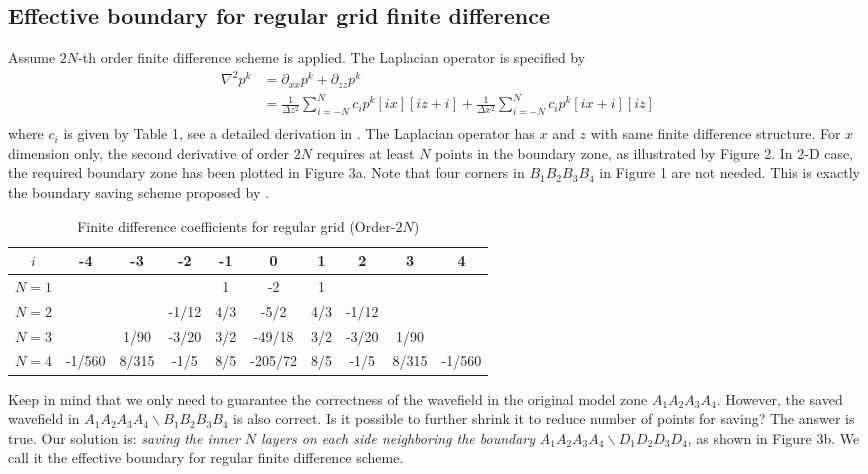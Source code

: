 \subsection{Effective boundary for regular grid finite difference}


Assume $2N$-th order finite difference scheme is applied. The Laplacian operator is specified by
\begin{equation}
\begin{array}{rl}
 \nabla^2 p^{k}&=\partial_{xx}p^{k}+\partial_{zz}p^{k}\\
 &=\frac{1}{\Delta z^2}\sum_{i=-N}^Nc_ip^k[ix][iz+i]+\frac{1}{\Delta x^2}\sum_{i=-N}^Nc_i p^k[ix+i][iz]\\
\end{array}
\end{equation}
where $c_i$ is given by Table 1, see a detailed derivation in \cite{fornberg1988generation}. The Laplacian operator has $x$ and $z$ with same finite difference structure. For $x$ dimension only, the second derivative of order $2N$ requires at least $N$ points in the boundary zone, as illustrated by Figure 2. In 2-D case, the required boundary zone has been plotted in Figure 3a. Note that four corners in $B_1B_2B_3B_4$ in Figure 1 are not needed. This is exactly the boundary saving scheme proposed by \cite{dussaud2008computational}.

\begin{table*}
  \centering
  \caption{Finite difference coefficients for regular grid (Order-$2N$)}\label{table:1}
  \begin{tabular}{c|c|c|c|c|c|c|c|c|c}
     \hline
     $i$  &-4 	& -3 	& -2 	& -1 	& 0 	& 1 	& 2 	& 3 	& 4\\
     \hline
     $N=1$	     & 	     & 	&  	& 1 	& -2 	& 1 	&  	&   	&  \\
     $N=2$	     &  	    & 	&-1/12	&4/3	&-5/2	&4/3	&-1/12	&   	&  \\
     $N=3$	     & 	     & 1/90	&-3/20	&3/2	&-49/18	&3/2	&-3/20	&1/90	&  \\
     $N=4$	     &-1/560 &8/315	&-1/5	&8/5	&-205/72&8/5	&-1/5	&8/315	&-1/560 \\
     \hline
   \end{tabular}
\end{table*}

Keep in mind that we only need to guarantee the correctness of the wavefield in the original model zone $A_1A_2A_3A_4$. However, the saved wavefield in $A_1A_2A_3A_4\backslash B_1B_2B_3B_4$ is also correct. Is it possible to further shrink it to reduce number of points for saving? The answer is true. Our solution is: \emph{saving the inner $N$ layers on each side neighboring the boundary} $A_1A_2A_3A_4\backslash D_1D_2D_3D_4$, as shown in Figure 3b. We call it the effective boundary for regular finite difference scheme.

